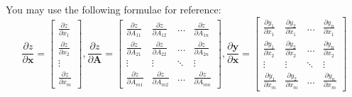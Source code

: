 \documentclass[answers]{exam}
\begin{document}
You may use the following formulae for reference:
\begin{equation*}
    \frac{\partial z}{\partial \mathbf{x}}
    =
    \begin{bmatrix}
        \frac{\partial z}{\partial x_{1}}\\
        \frac{\partial z}{\partial x_{2}}\\
        \vdots\\
        \frac{\partial z}{\partial x_{m}}
    \end{bmatrix}
    ,
    \frac{\partial z}{\partial \mathbf{A}}
    =
    \begin{bmatrix}
        \frac{\partial z}{\partial A_{11}} & \frac{\partial z}{\partial A_{12}} & \dots  & \frac{\partial z}{\partial A_{1n}} \\
        \frac{\partial z}{\partial A_{21}} & \frac{\partial z}{\partial A_{22}} & \dots  & \frac{\partial z}{\partial A_{2n}} \\
        \vdots & \vdots & \ddots & \vdots \\
        \frac{\partial z}{\partial A_{m1}} & \frac{\partial z}{\partial A_{m2}} & \dots  & \frac{\partial z}{\partial A_{mn}}
    \end{bmatrix}
    ,
    \frac{\partial \mathbf{y}}{\partial \mathbf{x}}
    =
    \begin{bmatrix}
        \frac{\partial y_{1}}{\partial x_{1}} & \frac{\partial y_{2}}{\partial x_{1}} & \dots  & \frac{\partial y_{n}}{\partial x_{1}} \\
        \frac{\partial y_{1}}{\partial x_{2}} & \frac{\partial y_{2}}{\partial x_{2}} & \dots  & \frac{\partial y_{n}}{\partial x_{2}} \\
        \vdots & \vdots & \ddots & \vdots \\
        \frac{\partial y_{1}}{\partial x_{m}} & \frac{\partial y_{2}}{\partial x_{m}} & \dots  & \frac{\partial y_{n}}{\partial x_{m}}
    \end{bmatrix}
\end{equation*}
\end{document}
